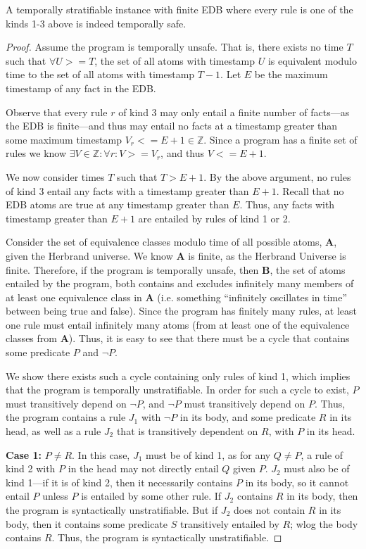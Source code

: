 \begin{lemma} 
%
A temporally stratifiable \slang instance with finite EDB where every rule is
one of the kinds 1-3 above is indeed temporally safe.
%
\end{lemma}
%
\begin{proof}
%
Assume the program is temporally unsafe.  That is, there exists no time $T$
such that $\forall U >= T$, the set of all atoms with timestamp $U$ is
equivalent modulo time to the set of all atoms with timestamp $T-1$.  Let $E$
be the maximum timestamp of any fact in the EDB.

Observe that every rule $r$ of kind 3 may only entail a finite number
of facts---as the EDB is finite---and thus may entail no facts at a
timestamp greater than some maximum timestamp $V_r <= E+1 \in
\mathbb{Z}$.  Since a \slang program has a finite set of rules we know
$\exists V \in \mathbb{Z} : \forall r: V >= V_r$, and thus $V <= E+1$.

We now consider times $T$ such that $T > E+1$.  By the above argument, no rules
of kind 3 entail any facts with a timestamp greater than $E+1$.  Recall that
no EDB atoms are true at any timestamp greater than $E$.  Thus, any facts with
timestamp greater than $E+1$ are entailed by rules of kind 1 or 2.

Consider the set of equivalence classes modulo time of all possible atoms, {\bf
A}, given the Herbrand universe.  We know {\bf A} is finite, as the Herbrand
Universe is finite.  Therefore, if the program is temporally unsafe, then {\bf B}, the
set of atoms entailed by the program, both contains and excludes
infinitely many members of at least one equivalence class in {\bf A} (i.e.
something ``infinitely oscillates in time'' between being true and false).
Since the program has finitely many rules, at least one rule must entail
infinitely many atoms (from at least one of the equivalence classes from {\bf
A}). Thus, it is easy to see that there must be a cycle that contains some predicate $P$ and $\lnot P$.

We show there exists such a cycle containing only rules of kind 1, which
implies that the program is temporally unstratifiable.  In order for such a
cycle to exist, $P$ must transitively depend on $\lnot P$, and $\lnot P$ must
transitively depend on $P$.  Thus, the program contains a rule $J_1$ with
$\lnot P$ in its body, and some predicate $R$ in its head, as well as a rule
$J_2$ that is transitively dependent on $R$, with $P$ in its head.

{\bf Case 1: }$P \neq R$.  In this case, $J_1$ must be of kind 1, as for any $Q
\neq P$, a rule of kind 2 with $P$ in the head may not directly entail $Q$
given $P$.  $J_2$ must also be of kind 1---if it is of kind 2, then it
necessarily contains $P$ in its body, so it cannot entail $P$ unless $P$ is
entailed by some other rule.  If $J_2$ contains $R$ in its body, then the
program is syntactically unstratifiable.  But if $J_2$ does not contain $R$ in
its body, then it contains some predicate $S$ transitively entailed by $R$;
wlog the body contains $R$.  Thus, the program is syntactically unstratifiable.


\end{proof}
